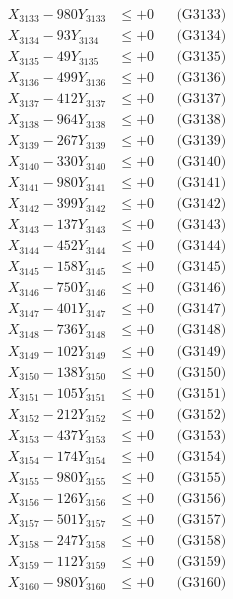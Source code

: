 \documentclass[a4paper,10pt]{article}
\begin{document}
{\begin{align}
X_{3133} - 980Y_{3133} &\leq +0 && \text{(G3133)} \\
X_{3134} - 93Y_{3134} &\leq +0 && \text{(G3134)} \\
X_{3135} - 49Y_{3135} &\leq +0 && \text{(G3135)} \\
X_{3136} - 499Y_{3136} &\leq +0 && \text{(G3136)} \\
X_{3137} - 412Y_{3137} &\leq +0 && \text{(G3137)} \\
X_{3138} - 964Y_{3138} &\leq +0 && \text{(G3138)} \\
X_{3139} - 267Y_{3139} &\leq +0 && \text{(G3139)} \\
X_{3140} - 330Y_{3140} &\leq +0 && \text{(G3140)} \\
\allowbreak
X_{3141} - 980Y_{3141} &\leq +0 && \text{(G3141)} \\
X_{3142} - 399Y_{3142} &\leq +0 && \text{(G3142)} \\
X_{3143} - 137Y_{3143} &\leq +0 && \text{(G3143)} \\
X_{3144} - 452Y_{3144} &\leq +0 && \text{(G3144)} \\
X_{3145} - 158Y_{3145} &\leq +0 && \text{(G3145)} \\
X_{3146} - 750Y_{3146} &\leq +0 && \text{(G3146)} \\
X_{3147} - 401Y_{3147} &\leq +0 && \text{(G3147)} \\
X_{3148} - 736Y_{3148} &\leq +0 && \text{(G3148)} \\
X_{3149} - 102Y_{3149} &\leq +0 && \text{(G3149)} \\
X_{3150} - 138Y_{3150} &\leq +0 && \text{(G3150)} \\
\allowbreak
X_{3151} - 105Y_{3151} &\leq +0 && \text{(G3151)} \\
X_{3152} - 212Y_{3152} &\leq +0 && \text{(G3152)} \\
X_{3153} - 437Y_{3153} &\leq +0 && \text{(G3153)} \\
X_{3154} - 174Y_{3154} &\leq +0 && \text{(G3154)} \\
X_{3155} - 980Y_{3155} &\leq +0 && \text{(G3155)} \\
X_{3156} - 126Y_{3156} &\leq +0 && \text{(G3156)} \\
X_{3157} - 501Y_{3157} &\leq +0 && \text{(G3157)} \\
X_{3158} - 247Y_{3158} &\leq +0 && \text{(G3158)} \\
X_{3159} - 112Y_{3159} &\leq +0 && \text{(G3159)} \\
X_{3160} - 980Y_{3160} &\leq +0 && \text{(G3160)} \\

\end{align}}
\end{document}

